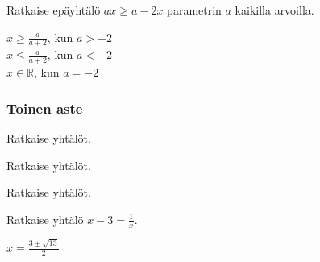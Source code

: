 \begin{tehtava} 
Ratkaise epäyhtälö $ax \geq a-2x$ parametrin $a$ kaikilla arvoilla.
    \begin{vastaus}
        $x \geq \frac{a}{a+2}$, kun $a > -2$ \\
        $x \leq \frac{a}{a+2}$, kun $a < -2$ \\
    $x \in \mathbb{R}$, kun $a = -2$ \\
	\end{vastaus}
\end{tehtava}

\subsubsection*{Toinen aste}

\begin{tehtava} 
Ratkaise yhtälöt.
    \begin{vastaus}
    \end{vastaus}
\end{tehtava}

\begin{tehtava}
    Ratkaise yhtälöt.
    \begin{vastaus}
    \end{vastaus}
\end{tehtava}

\begin{tehtava}
    Ratkaise yhtälöt.
    \begin{vastaus}
    \end{vastaus}
\end{tehtava}

\begin{tehtava}
Ratkaise yhtälö $x - 3 = \frac{1}{x}$.
    \begin{vastaus}
    $x =\frac{3 \pm \sqrt{13}}{2}$
    \end{vastaus}
\end{tehtava}

